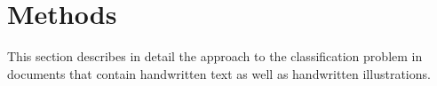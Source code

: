 \section{Methods}

This section describes in detail the approach to the classification problem
in documents that contain handwritten text as well as handwritten illustrations.
